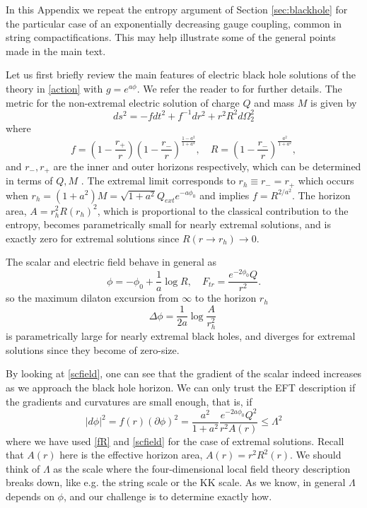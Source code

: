 \documentclass[11pt]{article}
\numberwithin{equation}{section}
\newcommand{\beq}{\begin{equation}}  \newcommand{\eeq}{\end{equation}}
\numberwithin{equation}{section}
\theoremstyle{remark}
\begin{document}
In this Appendix we repeat the entropy argument of Section \ref{sec:blackhole} for the particular case of an exponentially decreasing gauge coupling, common in string compactifications. This may help illustrate some of the general points made in the main text.

Let us first briefly review the main features of electric black hole solutions of the theory in \eqref{action} with $g=e^{a\phi}$. We refer the reader to \cite{Garfinkle:1990qj,Draper:2019utz} for further details.
The metric for the non-extremal electric solution of charge $Q$ and mass $M$ is given by
\beq
\label{ansatz}
ds^2=-fdt^2+f^{-1}dr^2+r^2R^2d\Omega_2^2
\eeq
where 
\begin{equation}\label{fR}f=\left(1-\frac{r_+}{r}\right)\left(1-\frac{r_-}{r}\right)^{\frac{1-a^2}{1+a^2}},\quad R= \left(1-\frac{r_-}{r}\right)^{\frac{a^2}{1+a^2}},\end{equation}
and $r_-,r_+$ are the inner and outer horizons respectively, which can be determined in terms of $Q,M$ \cite{Garfinkle:1990qj}. The extremal limit corresponds to $r_h\equiv r_-=r_+$ which occurs when $r_h=(1+a^2)M=\sqrt{1+a^2}Q_{ext}e^{-a\phi_0}$ and implies
$f=R^{2/a^2}$.
The horizon area, $A=r_h^2 R(r_h)^2$, which is proportional to the classical contribution to the entropy, becomes parametrically small for nearly extremal solutions, and is exactly zero for extremal solutions since $R(r\rightarrow r_h)\rightarrow 0$.

The scalar and electric field behave in general as \cite{Garfinkle:1990qj,Draper:2019utz}
\begin{equation}
\phi=-\phi_0+\frac1a\log R%
,\quad F_{tr}=\frac{e^{-2\phi_0}Q}{r^2}.
\label{scfield}
\end{equation}
so the maximum dilaton excursion from $\infty$ to the horizon $r_h$ 
 \beq\Delta\phi= \frac1{2a} \log\frac{A}{r_h^2}\ \eeq
 is parametrically large for nearly extremal black holes, and diverges for extremal solutions since they become of zero-size.

By looking at \eqref{scfield}, one can see that  the gradient of the scalar indeed increases as we approach the black hole horizon. We can only trust the EFT description if the gradients and curvatures are small enough, that is, if\beq
\vert d\phi\vert^2=f(r)(\partial\phi)^2=\frac{a^2}{1+a^2}\frac{e^{-2a\phi_0}Q^2}{r^2A(r)}\leq \Lambda^2
\label{grad}
\eeq
where we have used \eqref{fR} and \eqref{scfield} for the case of extremal solutions. Recall that $A(r)$ here is the effective horizon area, $A(r)=r^2 R^2(r)$.
We should think of $\Lambda$ as the scale where the four-dimensional local field theory description  breaks down, like e.g. the string scale or the KK scale. As we know, in general $\Lambda$ depends on $\phi$, and our challenge is to determine exactly how. 
\end{document}

